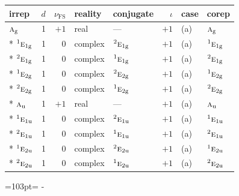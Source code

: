 \documentclass[10pt,a4paper]{article}
\newcommand{\needspace}[1]{\par\penalty-100\begingroup\dimen0=#1\relax\dimen2=\pagegoal
  \advance\dimen2-\pagetotal\ifdim\dimen0>\dimen2\relax\ifdim\dimen2>0pt\vfil\break\fi\fi
  \endgroup}
\numberwithin{equation}{section}
\newcommand{\irr}[1]{\text{\normalfont\scshape #1}}
\newcommand{\conjpair}[1]{{}^{#1}}
\newcommand{\ptag}[1]{\mathrm{#1}}
\newcommand{\fsind}{\nu_{\mathrm{FS}}}
\begin{document}
{\small\renewcommand{\arraystretch}{1.25}\setlength{\tabcolsep}{4pt}\begin{longtable}{@{}lrrllrll@{}}\toprule
irrep & $d$ & $\fsind$ & reality & conjugate & $\iota$ & case & corep\\\midrule\endhead
\bottomrule\endfoot\endlastfoot
$\irr{a}_{\ptag{g}}$ & 1 & $+1$ & real & --- & $+1$ & (a) & $\irr{a}_{\ptag{g}}$\\*
$\conjpair{1}\irr{e}_{1\ptag{g}}$ & 1 & $0$ & complex & $\conjpair{2}\irr{e}_{1\ptag{g}}$ & $+1$ & (a) & $\conjpair{1}\irr{e}_{1\ptag{g}}$\\*
$\conjpair{2}\irr{e}_{1\ptag{g}}$ & 1 & $0$ & complex & $\conjpair{1}\irr{e}_{1\ptag{g}}$ & $+1$ & (a) & $\conjpair{2}\irr{e}_{1\ptag{g}}$\\*
$\conjpair{1}\irr{e}_{2\ptag{g}}$ & 1 & $0$ & complex & $\conjpair{2}\irr{e}_{2\ptag{g}}$ & $+1$ & (a) & $\conjpair{1}\irr{e}_{2\ptag{g}}$\\*
$\conjpair{2}\irr{e}_{2\ptag{g}}$ & 1 & $0$ & complex & $\conjpair{1}\irr{e}_{2\ptag{g}}$ & $+1$ & (a) & $\conjpair{2}\irr{e}_{2\ptag{g}}$\\*
$\irr{a}_{\ptag{u}}$ & 1 & $+1$ & real & --- & $+1$ & (a) & $\irr{a}_{\ptag{u}}$\\*
$\conjpair{1}\irr{e}_{1\ptag{u}}$ & 1 & $0$ & complex & $\conjpair{2}\irr{e}_{1\ptag{u}}$ & $+1$ & (a) & $\conjpair{1}\irr{e}_{1\ptag{u}}$\\*
$\conjpair{2}\irr{e}_{1\ptag{u}}$ & 1 & $0$ & complex & $\conjpair{1}\irr{e}_{1\ptag{u}}$ & $+1$ & (a) & $\conjpair{2}\irr{e}_{1\ptag{u}}$\\*
$\conjpair{1}\irr{e}_{2\ptag{u}}$ & 1 & $0$ & complex & $\conjpair{2}\irr{e}_{2\ptag{u}}$ & $+1$ & (a) & $\conjpair{1}\irr{e}_{2\ptag{u}}$\\*
$\conjpair{2}\irr{e}_{2\ptag{u}}$ & 1 & $0$ & complex & $\conjpair{1}\irr{e}_{2\ptag{u}}$ & $+1$ & (a) & $\conjpair{2}\irr{e}_{2\ptag{u}}$\\
\bottomrule\end{longtable}}
\needspace{103pt}
\end{document}
